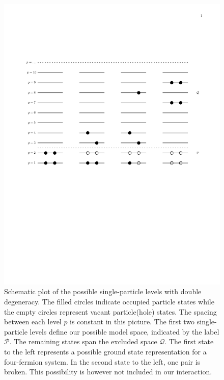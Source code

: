 \documentclass[%
twoside,                 %
final,                   %
10pt]{article}
\begin{document}
\begin{figure}[t]
  \centerline{\includegraphics[width=0.6\linewidth]{fig-proj/simplemodel.pdf}}
  \caption{
  Schematic plot of the possible single-particle levels with double degeneracy.  The filled circles indicate occupied particle  states while the empty circles represent vacant particle(hole)  states.  The spacing between each level $p$ is constant in this picture.  The first two single-particle levels define our possible  model space, indicated by the label $\mathcal{P}$.  The remaining  states span the excluded space $\mathcal{Q}$.  The first state to  the left represents a possible ground state representation for a  four-fermion system. In the second state to the left, one pair is   broken. This possibility is however not included in our  interaction. \label{fig:schematic}
  }
\end{figure}
\end{document}
